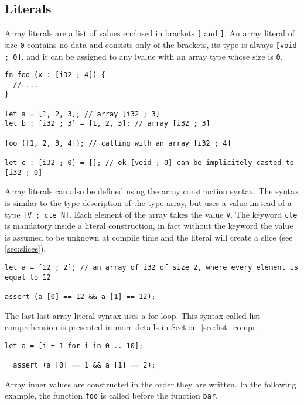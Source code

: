 \subsection {Literals}

Array literals are a list of values enclosed in brackets \texttt{[} and
  \texttt{]}. An array literal of size \texttt{0} contains no data and consists
only of the brackets, its type is always \texttt{[void ; 0]}, and it can be
assigned to any lvalue with an array type whose size is \texttt{0}.

\begin{lstlisting}[style=coloredverbatim]
fn foo (x : [i32 ; 4]) {
  // ...
}

let a = [1, 2, 3]; // array [i32 ; 3]
let b : [i32 ; 3] = [1, 2, 3]; // array [i32 ; 3]

foo ([1, 2, 3, 4]); // calling with an array [i32 ; 4]

let c : [i32 ; 0] = []; // ok [void ; 0] can be implicitely casted to [i32 ; 0]
\end{lstlisting}

Array literals can also be defined using the array construction syntax. The
syntax is similar to the type description of the type array, but uses a value
instead of a type \texttt{[V ; cte N]}. Each element of the array takes the
value \texttt{V}. The keyword \texttt{cte} is mandatory inside a literal
construction, in fact without the keyword the value is assumed to be unknown at
compile time and the literal will create a slice (see \ref{sec:slices}).

\begin{lstlisting}[style=coloredverbatim]
let a = [12 ; 2]; // an array of i32 of size 2, where every element is equal to 12

assert (a [0] == 12 && a [1] == 12);
\end{lstlisting}

The last last array literal syntax uses a for loop. This syntax called list
comprehension is presented in more details in Section~\ref{sec:list_compr}.

\begin{lstlisting}[style=coloredverbatim]
  let a = [i + 1 for i in 0 .. 10];

  assert (a [0] == 1 && a [1] == 2);
\end{lstlisting}


Array inner values are constructed in the order they are written. In the
following example, the function \texttt{foo} is called before the function
\texttt{bar}.

